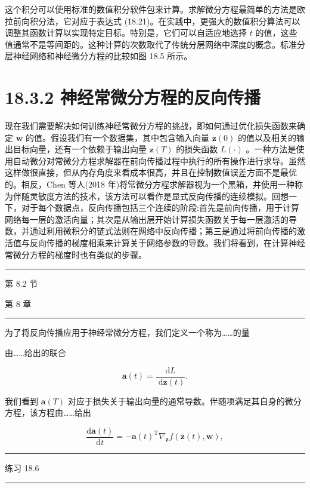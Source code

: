 \documentclass[10pt]{report}
\newcommand{\HRule}{\begin{center}\rule{0.9\linewidth}{0.2mm}\end{center}}
\begin{document}
这个积分可以使用标准的数值积分软件包来计算。求解微分方程最简单的方法是欧拉前向积分法，它对应于表达式 (18.21)。在实践中，更强大的数值积分算法可以调整其函数计算以实现特定目标。特别是，它们可以自适应地选择 \(t\) 的值，这些值通常不是等间距的。这种计算的次数取代了传统分层网络中深度的概念。标准分层神经网络和神经微分方程的比较如图 18.5 所示。

\section*{18.3.2 神经常微分方程的反向传播}

现在我们需要解决如何训练神经常微分方程的挑战，即如何通过优化损失函数来确定 \(\mathbf{w}\) 的值。假设我们有一个数据集，其中包含输入向量 \(\mathbf{z}\left( 0\right)\) 的值以及相关的输出目标向量，还有一个依赖于输出向量 \(\mathbf{z}\left( T\right)\) 的损失函数 \(L\left( \cdot \right)\) 。一种方法是使用自动微分对常微分方程求解器在前向传播过程中执行的所有操作进行求导。虽然这样做很直接，但从内存角度来看成本很高，并且在控制数值误差方面不是最优的。相反，Chen 等人(2018 年)将常微分方程求解器视为一个黑箱，并使用一种称为伴随灵敏度方法的技术，该方法可以看作是显式反向传播的连续模拟。回想一下，对于每个数据点，反向传播包括三个连续的阶段:首先是前向传播，用于计算网络每一层的激活向量；其次是从输出层开始计算损失函数关于每一层激活的导数，并通过利用微积分的链式法则在网络中反向传播；第三是通过将前向传播的激活值与反向传播的梯度相乘来计算关于网络参数的导数。我们将看到，在计算神经常微分方程的梯度时也有类似的步骤。

\HRule

第 8.2 节

第 8 章

\HRule

为了将反向传播应用于神经常微分方程，我们定义一个称为……的量

由……给出的联合

\[
\mathbf{a}\left( t\right)  = \frac{\mathrm{d}L}{\mathrm{\;d}\mathbf{z}\left( t\right) }. \tag{18.24}
\]

我们看到 \(\mathbf{a}\left( T\right)\) 对应于损失关于输出向量的通常导数。伴随项满足其自身的微分方程，该方程由……给出

\[
\frac{\mathrm{d}\mathbf{a}\left( t\right) }{\mathrm{d}t} =  - \mathbf{a}{\left( t\right) }^{\mathrm{T}}{\nabla }_{\mathbf{z}}f\left( {\mathbf{z}\left( t\right) ,\mathbf{w}}\right) , \tag{18.25}
\]

\HRule

练习 18.6

\HRule
\end{document}
